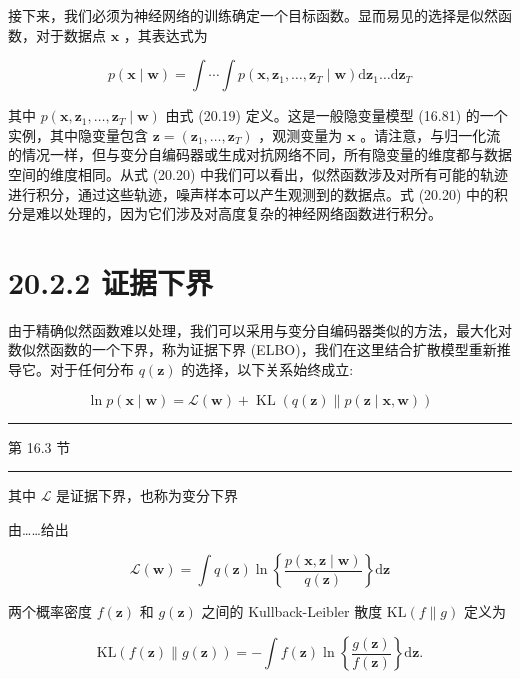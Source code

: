 \documentclass[10pt]{report}
\newcommand{\HRule}{\begin{center}\rule{0.9\linewidth}{0.2mm}\end{center}}
\begin{document}
接下来，我们必须为神经网络的训练确定一个目标函数。显而易见的选择是似然函数，对于数据点 \(\mathbf{x}\) ，其表达式为

\[
p\left( {\mathbf{x} \mid  \mathbf{w}}\right)  = \int \cdots \int p\left( {\mathbf{x},{\mathbf{z}}_{1},\ldots ,{\mathbf{z}}_{T} \mid  \mathbf{w}}\right) \mathrm{d}{\mathbf{z}}_{1}\ldots \mathrm{d}{\mathbf{z}}_{T} \tag{20.20}
\]

其中 \(p\left( {\mathbf{x},{\mathbf{z}}_{1},\ldots ,{\mathbf{z}}_{T} \mid  \mathbf{w}}\right)\) 由式 (20.19) 定义。这是一般隐变量模型 (16.81) 的一个实例，其中隐变量包含 \(\mathbf{z} = \left( {{\mathbf{z}}_{1},\ldots ,{\mathbf{z}}_{T}}\right)\) ，观测变量为 \(\mathbf{x}\) 。请注意，与归一化流的情况一样，但与变分自编码器或生成对抗网络不同，所有隐变量的维度都与数据空间的维度相同。从式 (20.20) 中我们可以看出，似然函数涉及对所有可能的轨迹进行积分，通过这些轨迹，噪声样本可以产生观测到的数据点。式 (20.20) 中的积分是难以处理的，因为它们涉及对高度复杂的神经网络函数进行积分。

\section*{20.2.2 证据下界}

由于精确似然函数难以处理，我们可以采用与变分自编码器类似的方法，最大化对数似然函数的一个下界，称为证据下界 (ELBO)，我们在这里结合扩散模型重新推导它。对于任何分布 \(q\left( \mathbf{z}\right)\) 的选择，以下关系始终成立:

\[
\ln p\left( {\mathbf{x} \mid  \mathbf{w}}\right)  = \mathcal{L}\left( \mathbf{w}\right)  + \operatorname{KL}\left( {q\left( \mathbf{z}\right) \parallel p\left( {\mathbf{z} \mid  \mathbf{x},\mathbf{w}}\right) }\right)  \tag{20.21}
\]

\HRule

第 16.3 节

\HRule

其中 \(\mathcal{L}\) 是证据下界，也称为变分下界

由……给出

\[
\mathcal{L}\left( \mathbf{w}\right)  = \int q\left( \mathbf{z}\right) \ln \left\{  \frac{p\left( {\mathbf{x},\mathbf{z} \mid  \mathbf{w}}\right) }{q\left( \mathbf{z}\right) }\right\}  \mathrm{d}\mathbf{z} \tag{20.22}
\]

两个概率密度 \(f\left( \mathbf{z}\right)\) 和 \(g\left( \mathbf{z}\right)\) 之间的 Kullback-Leibler 散度 \(\mathrm{{KL}}\left( {f\parallel g}\right)\) 定义为

\[
\mathrm{{KL}}\left( {f\left( \mathbf{z}\right) \parallel g\left( \mathbf{z}\right) }\right)  =  - \int f\left( \mathbf{z}\right) \ln \left\{  \frac{g\left( \mathbf{z}\right) }{f\left( \mathbf{z}\right) }\right\}  \mathrm{d}\mathbf{z}. \tag{20.23}
\]
\end{document}
